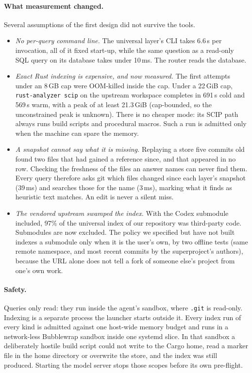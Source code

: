 \documentclass[11pt]{article}
\newcommand{\code}[1]{\texttt{#1}}
\begin{document}
\paragraph{What measurement changed.} Several assumptions of the first design did not survive the
tools.
\begin{itemize}
  \item \emph{No per-query command line.} The universal layer's CLI takes 6.6\,s per invocation,
    all of it fixed start-up, while the same question as a read-only SQL query on its database
    takes under 10\,ms. The router reads the database.
  \item \emph{Exact Rust indexing is expensive, and now measured.} The first attempts under an
    8\,GB cap were OOM-killed inside the cap. Under a 22\,GiB cap, \code{rust-analyzer scip} on
    the upstream workspace completes in 691\,s cold and 569\,s warm, with a peak of at least
    21.3\,GiB (cap-bounded, so the unconstrained peak is unknown). There is no cheaper mode: its
    SCIP path always runs build scripts and procedural macros. Such a run is admitted only when
    the machine can spare the memory.
  \item \emph{A snapshot cannot say what it is missing.} Replaying a store five commits old found
    two files that had gained a reference since, and that appeared in no row. Checking the
    freshness of the files an answer names can never find them. Every query therefore asks git
    which files changed since each layer's snapshot (39\,ms) and searches those for the name
    (3\,ms), marking what it finds as heuristic text matches. An edit is never a silent miss.
  \item \emph{The vendored upstream swamped the index.} With the Codex submodule included, 97\% of
    the universal index of our repository was third-party code. Submodules are now excluded. The
    policy we specified but have not built indexes a submodule only when it is the user's own, by
    two offline tests (same remote namespace, and most recent commits by the superproject's
    authors), because the URL alone does not tell a fork of someone else's project from one's own
    work.
\end{itemize}

\paragraph{Safety.} Queries only read: they run inside the agent's sandbox, where \code{.git} is
read-only. Indexing is a separate process the launcher starts outside it. Every index run of every
kind is admitted against one host-wide memory budget and runs in a network-less Bubblewrap sandbox
inside one systemd slice. In that sandbox a deliberately hostile build script could not write to
the Cargo home, read a marker file in the home directory or overwrite the store, and the index was
still produced. Starting the model server stops those scopes before its own pre-flight.
\end{document}
